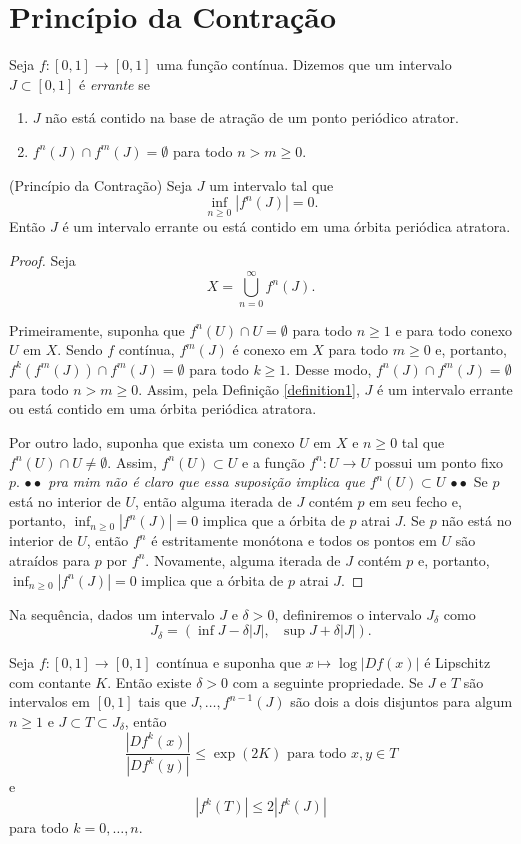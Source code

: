 \section{Princípio da Contração}

\begin{definition}
\label{definition1}
Seja $f: [0,1] \to [0,1]$ uma função contínua. Dizemos que um intervalo $J \subset [0,1]$ é \textit{errante} se
\begin{enumerate}
\item $J$ não está contido na base de atração de um ponto periódico atrator.
\item $f^n(J) \cap f^m(J) = \emptyset$ para todo $n > m \geq 0$.
\end{enumerate}


\begin{lemma}(Princípio da Contração)
Seja $J$ um intervalo tal que
$$\inf_{n \geq 0} |f^n(J)| = 0.$$
Então $J$ é um intervalo errante ou está contido em uma órbita periódica atratora.
\end{lemma}

\begin{proof}
Seja $$X = \bigcup_{n = 0}^\infty f^n(J).$$

Primeiramente, suponha que $f^n(U) \cap U = \emptyset$ para todo $n \geq 1$ e para todo conexo $U$ em $X$. Sendo $f$ contínua, $f^m(J)$ é conexo em $X$ para todo $m \geq 0$ e, portanto, $f^k(f^m(J)) \cap f^m(J) = \emptyset$ para todo $k \geq 1$. Desse modo, $f^n(J) \cap f^m(J) = \emptyset$ para todo $n > m \geq 0$. Assim, pela Definição \ref{definition1}, $J$ é um intervalo errante ou está contido em uma órbita periódica atratora.

Por outro lado, suponha que exista um conexo $U$ em $X$ e $n \geq 0$ tal que $f^n(U) \cap U \neq \emptyset$. Assim, $f^n(U) \subset U$ e a função $f^n: U \to U$ possui um ponto fixo $p$. \textit{$\bullet \bullet$ pra mim não é claro que essa suposição implica que $f^n(U) \subset U$ $\bullet \bullet$}
Se $p$ está no interior de $U$, então alguma iterada de $J$ contém $p$ em seu fecho e, portanto, $\inf_{n \geq 0} |f^n(J)| = 0$ implica que a órbita de $p$ atrai $J$. Se $p$ não está no interior de $U$, então $f^n$ é estritamente monótona e todos os pontos em $U$ são atraídos para $p$ por $f^n$. Novamente, alguma iterada de $J$ contém $p$ e, portanto, $\inf_{n \geq 0} |f^n(J)| = 0$ implica que a órbita de $p$ atrai $J$.
\end{proof}
Na sequência, dados um intervalo $J$ e $\delta > 0$, definiremos o intervalo $J_\delta$ como
$$J_\delta = (\inf J - \delta |J| , \textrm{ } \sup J + \delta |J|).$$
\begin{lemma}
Seja $f: [0,1] \to [0,1]$ contínua e suponha que $x \mapsto \log |Df(x)|$ é Lipschitz com contante $K$. Então existe $\delta > 0$ com a seguinte propriedade. Se $J$ e $T$ são intervalos em $[0,1]$ tais que $J, \dots, f^{n-1}(J)$ são dois a dois disjuntos para algum $n \geq 1$ e $J \subset T \subset J_\delta$, então
$$\frac{|Df^k(x)|}{|Df^k(y)|} \leq \exp(2K) \textrm{ para todo } x, y \in T$$
e
$$|f^k(T)| \leq 2 |f^k(J)|$$
para todo $k = 0, \dots, n$.
\end{lemma}


\end{definition}
